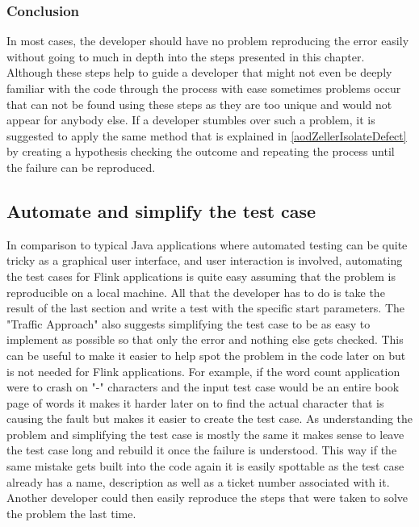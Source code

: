 \subsubsection{Conclusion}
In most cases, the developer should have no problem reproducing the error easily without going to much in depth into the steps presented in this chapter. Although these steps help to guide a developer that might not even be deeply familiar with the code through the process with ease sometimes problems occur that can not be found using these steps as they are too unique and would not appear for anybody else. If a developer stumbles over such a problem, it is suggested to apply the same method that is explained in \ref{aodZellerIsolateDefect} by creating a hypothesis checking the outcome and repeating the process until the failure can be reproduced.

\subsection{Automate and simplify the test case}
In comparison to typical Java applications where automated testing can be quite tricky as a graphical user interface, and user interaction is involved, automating the test cases for Flink applications is quite easy assuming that the problem is reproducible on a local machine. All that the developer has to do is take the result of the last section and write a test with the specific start parameters. The "Traffic Approach" also suggests simplifying the test case to be as easy to implement as possible so that only the error and nothing else gets checked. This can be useful to make it easier to help spot the problem in the code later on but is not needed for Flink applications. For example, if the word count application were to crash on "-" characters and the input test case would be an entire book page of words it makes it harder later on to find the actual character that is causing the fault but makes it easier to create the test case. As understanding the problem and simplifying the test case is mostly the same it makes sense to leave the test case long and rebuild it once the failure is understood. This way if the same mistake gets built into the code again it is easily spottable as the test case already has a name, description as well as a ticket number associated with it. Another developer could then easily reproduce the steps that were taken to solve the problem the last time.

